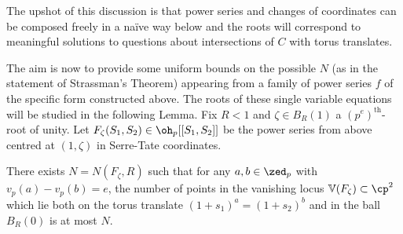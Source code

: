 \documentclass[12pt,letterpaper]{article}
\begin{document}
	The upshot of this discussion is that power series and changes of coordinates can be composed freely in a na\"ive way below and the roots will correspond to meaningful solutions to questions about intersections of $C$ with torus translates.
	
	

	
	The aim is now to provide some uniform bounds on the possible $N$ (as in the statement of Strassman's Theorem) appearing from a family of power series $f$ of the specific form constructed above. The roots of these single variable equations will be studied in the following Lemma. Fix $R<1$ and $\zeta\in B_R(1)$ a $(p^e)^\text{th}$-root of unity. Let $F_\zeta(S_1,S_2)\in \oh_p[[S_1,S_2]]$ be the power series from above centred at $(1,\zeta)$ in Serre-Tate coordinates.
	
	
	\begin{lemma} \label{singletorus}
		 There exists $N=N(F_\zeta,R)$ such that for any $a,b\in \zed_p$ with $v_p(a)-v_p(b)=e$, the number of points in the vanishing locus $\mathbb{V}(F_\zeta)\subset \cp^2$ which lie both on the torus translate $(1+s_1)^{a}=(1+s_2)^b$ and in the ball $B_R(0)$ is at most $N$.
	\end{lemma}
	
\end{document}
